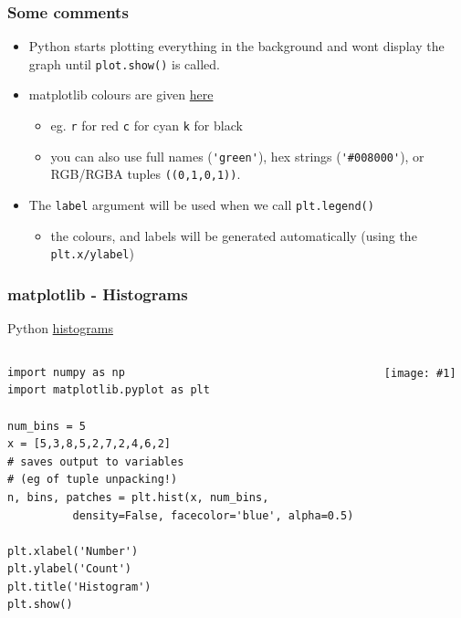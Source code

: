 \documentclass[xcolor=svgnames]{beamer}
\newcommand{\nl}{\\[1em]}
\newcommand{\ipic}[2]{\texttt{[image: \#1]}}
\newcommand{\ft}[1]{\frametitle{#1}}
\begin{document}
\begin{frame}[fragile]\ft{Some comments}
\begin{itemize}
\item Python starts plotting everything in the background and wont display the graph until {\tt plot.show()} is called.\nl

\item matplotlib colours are given  \href{https://matplotlib.org/2.1.1/api/_as_gen/matplotlib.pyplot.plot.html}{here}
\vspace{-.3em}
\begin{itemize}
\item eg. {\tt r} for red {\tt c} for cyan {\tt k} for black
\item you can also use full names (\verb|'green'|), hex strings (\verb|'#008000'|), or RGB/RGBA tuples \verb|((0,1,0,1))|.\nl%
\end{itemize}
\item The {\tt label} argument will be used when we call {\tt plt.legend()}
\begin{itemize}
\item the colours, and labels will be generated automatically (using the {\tt plt.x/ylabel})
\end{itemize}

\end{itemize}

\end{frame}






\begin{frame}[fragile]\ft{matplotlib - Histograms }
Python \href{https://matplotlib.org/3.1.0/api/_as_gen/matplotlib.pyplot.hist.html}{histograms}
\begin{columns}[T] %
\begin{column}{.50\textwidth}
\begin{Verbatim}[xleftmargin=.1in] 
import numpy as np
import matplotlib.pyplot as plt

num_bins = 5
x = [5,3,8,5,2,7,2,4,6,2]
# saves output to variables
# (eg of tuple unpacking!)
n, bins, patches = plt.hist(x, num_bins, 
          density=False, facecolor='blue', alpha=0.5)

plt.xlabel('Number')
plt.ylabel('Count')
plt.title('Histogram')
plt.show()
\end{Verbatim}
\end{column}%
\hfill%
\begin{column}{.46\textwidth}
\ipic{hist}{0.9}
\end{column}%
\end{columns}
\end{frame}
\end{document}
